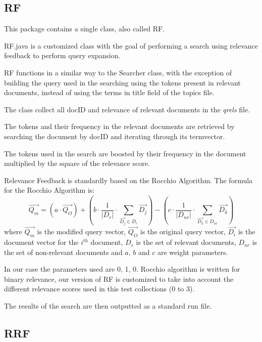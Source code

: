 \subsection{RF}
  
      This package contains a single class, also called RF.
        
        RF.java is a customized class with the goal of performing a search using relevance feedback to perform query expansion.
        
        RF functions in a similar way to the Searcher class, with the exception of building the query used in the searching using the tokens present in relevant documents, instead of using the terms in title field of the topics file.
        
        The class collect all docID and relevance of relevant documents in the \textit{qrels} file.
        
        The tokens and their frequency in the relevant documents are retrieved by searching the document by docID and iterating through its termvector.
        
        The tokens used in the search are boosted by their frequency in the document multiplied by the square of the relevance score.
        
        Relevance Feedback is standardly based on the Rocchio Algorithm.
        The formula for the Rocchio Algorithm is:
        $$
        \overrightarrow{Q_{m}}=
        \left(a\cdot\overrightarrow{Q_{O}}\right)+
        \left(b\cdot\frac{1}{|D_{r}|}\cdot\sum_{\overrightarrow{D_{j}}\in D_{r}}\overrightarrow{D_{j}}\right)-
        \left(c\cdot\frac{1}{|D_{nr}|}\cdot\sum_{\overrightarrow{D_{k}}\in D_{nr}}\overrightarrow{D_{k}}\right)
        $$
        where $\overrightarrow{Q_{m}}$ is the modified query vector, $\overrightarrow{Q_{O}}$ is the original query vector, $\overrightarrow{D_{i}}$ is the document vector for the $i^{th}$ document, $D_{r}$ is the set of relevant documents, $D_{nr}$ is the set of non-relevant documents and $a$, $b$ and $c$ are weight parameters.
        
        In our case the parameters used are 0, 1, 0.
        Rocchio algorithm is written for binary relevance, our version of RF is customized to take into account the different relevance scores used in this test collections (0 to 3).
        
        The results of the search are then outputted as a standard run file.
        
\subsection{RRF}
  
